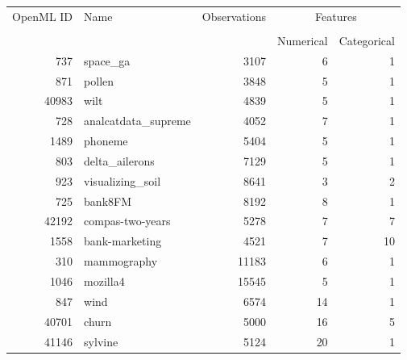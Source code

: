 \begin{table}[h!]
\centering
\begin{tabular}{rlrrr}
\toprule
\multirow{2}{*}{OpenML ID} & \multirow{2}{*}{Name} & \multirow{2}{*}{Observations} & \multicolumn{2}{c}{Features} \\ \cline{4-5}
\\[-0.75em]
&                       &                            & Numerical    & Categorical   \\
\midrule
       737 &                       space\_ga &         3107 &                6 &                1 \\
       871 &                         pollen &         3848 &                5 &                1 \\
     40983 &                           wilt &         4839 &                5 &                1 \\
       728 &            analcatdata\_supreme &         4052 &                7 &                1 \\
      1489 &                        phoneme &         5404 &                5 &                1 \\
       803 &                 delta\_ailerons &         7129 &                5 &                1 \\
       923 &               visualizing\_soil &         8641 &                3 &                2 \\
       725 &                        bank8FM &         8192 &                8 &                1 \\
     42192 &               compas-two-years &         5278 &                7 &                7 \\
      1558 &                 bank-marketing &         4521 &                7 &               10 \\
       310 &                    mammography &        11183 &                6 &                1 \\
      1046 &                       mozilla4 &        15545 &                5 &                1 \\
       847 &                           wind &         6574 &               14 &                1 \\
     40701 &                          churn &         5000 &               16 &                5 \\
     41146 &                        sylvine &         5124 &               20 &                1 \\

\end{tabular}
\end{table}
